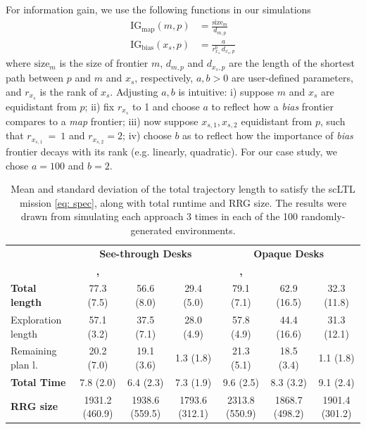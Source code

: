 For information gain, we use the following functions in our simulations
%
\begin{align}
    \mathrm{IG_{map}}(m, p) &= \frac{\mathrm{size}_m}{d_{m, p}} \\
    \mathrm{IG_{bias}}(x_s, p) &= \frac{a}{r^{b}_{x_s} \, d_{x_s, p}}
\end{align} %
%
where $\mathrm{size}_m$ is the size of frontier $m$, $d_{m, p}$ and $d_{x_s, p}$ are the length of the shortest path between $p$ and $m$ and $x_s$, respectively, $a,b > 0$ are  user-defined parameters, and $r_{x_s}$ is the rank of $x_s$. Adjusting $a,b$ is intuitive: i) suppose $m$ and $x_s$ are equidistant from $p$; ii) fix $r_{x_s}$ to 1 and choose $a$ to reflect how a \emph{bias} frontier compares to a \emph{map} frontier; iii) now suppose $x_{s,1}, x_{s,2}$ equidistant from $p$, such that $r_{x_{s,1}}~=~1$ and $r_{x_{s,2}} = 2$; iv) choose $b$ as to reflect how the importance of \emph{bias} frontier decays with its rank (e.g. linearly, quadratic). For our case study, we chose $a=100$ and $b=2$.

\begin{table}%
    \centering
    \caption{Mean and standard deviation of the total trajectory length to satisfy the scLTL mission \eqref{eq: spec}, along with total runtime and RRG size. The results were drawn from simulating each approach 3 times in each of the 100 randomly-generated environments.}\label{tab:my_label2}
    \setlength{\tabcolsep}{3pt}
    \footnotesize
    \begin{tabular}{l c c c | c c c }
        \toprule
        \textbf{} & \multicolumn{3}{c}{\textbf{See-through Desks}} & \multicolumn{3}{c}{\textbf{Opaque Desks}} \\
        \cmidrule(lr{.75em}){2-4} \cmidrule(l{.75em}r){5-7}
		&\textbf{\sep}&\textbf{\tog}&\textbf{\bia}&\textbf{\sep}&\textbf{\tog}&\textbf{\bia}\\
		\midrule
		\textbf{Total length}     & 77.3 (7.5) & 56.6 (8.0) & 29.4 (5.0) & 79.1 (7.1) & 62.9 (16.5) & 32.3 (11.8) \\
		\multicolumn{1}{l}{Exploration length}  & 57.1 (3.2) & 37.5 (7.1) & 28.0 (4.9) & 57.8 (4.9) & 44.4 (16.6) & 31.3 (12.1) \\
		\multicolumn{1}{l}{Remaining plan l.} & 20.2 (7.0) & 19.1 (3.6) & 1.3 (1.8) & 21.3 (5.1) & 18.5 (3.4) & 1.1 (1.8)\\
		\textbf{Total Time}       & 7.8 (2.0) & 6.4 (2.3) & 7.3 (1.9) & 9.6 (2.5) & 8.3 (3.2) & 9.1 (2.4)\\
		\textbf{RRG size}         & 1931.2 (460.9) & 1938.6 (559.5) & 1793.6 (312.1) & 2313.8 (550.9) & 1868.7 (498.2) & 1901.4 (301.2)\\
		\bottomrule
    \end{tabular}
\end{table}

